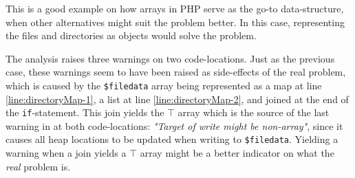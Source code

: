 This is a good example on how arrays in PHP serve as the go-to data-structure, when other alternatives might suit the problem better. In this case, representing the files and directories as objects would solve the problem.


The analysis raises three warnings on two code-locations. Just as the previous case, these warnings seem to have been raised as side-effects of the real problem, which is caused by the \texttt{\$filedata} array being represented as a map at line \ref{line:directoryMap-1}, a list at line \ref{line:directoryMap-2}, and joined at the end of the \texttt{if}-statement. This join yields the $\top$ array which is the source of the last warning in at both code-locations: \textit{"Target of write might be non-array"}, since it causes all heap locations to be updated when writing to \texttt{\$filedata}. Yielding a warning when a join yields a $\top$ array might be a better indicator on what the \textit{real} problem is.


